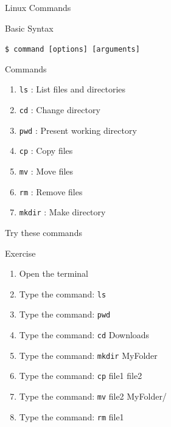 \documentclass[aspectratio=169]{beamer}
\begin{document}
\begin{frame}{Linux Commands}
    \begin{block}{Basic Syntax}

        \begin{center}
            \texttt{\$ command [options] [arguments]}
        \end{center}
        
    \end{block}


    \begin{block}{Commands}
        \begin{enumerate}
            \item \texttt{ls} : List files and directories
            \item \texttt{cd} : Change directory
            \item \texttt{pwd} : Present working directory
            \item \texttt{cp} : Copy files
            \item \texttt{mv} : Move files
            \item \texttt{rm} : Remove files
            \item \texttt{mkdir} : Make directory
        \end{enumerate}
    \end{block}

\end{frame}

\begin{frame}{Try these commands}
    \begin{block}{Exercise}
        \begin{enumerate}
            \item Open the terminal
            \item Type the command: \texttt{ls}
            \item Type the command: \texttt{pwd}
            \item Type the command: \texttt{cd} Downloads
            \item Type the command: \texttt{mkdir} MyFolder
            \item Type the command: \texttt{cp} file1 file2
            \item Type the command: \texttt{mv} file2 MyFolder/
            \item Type the command: \texttt{rm} file1
        \end{enumerate}
    \end{block}
\end{frame}
\end{document}

